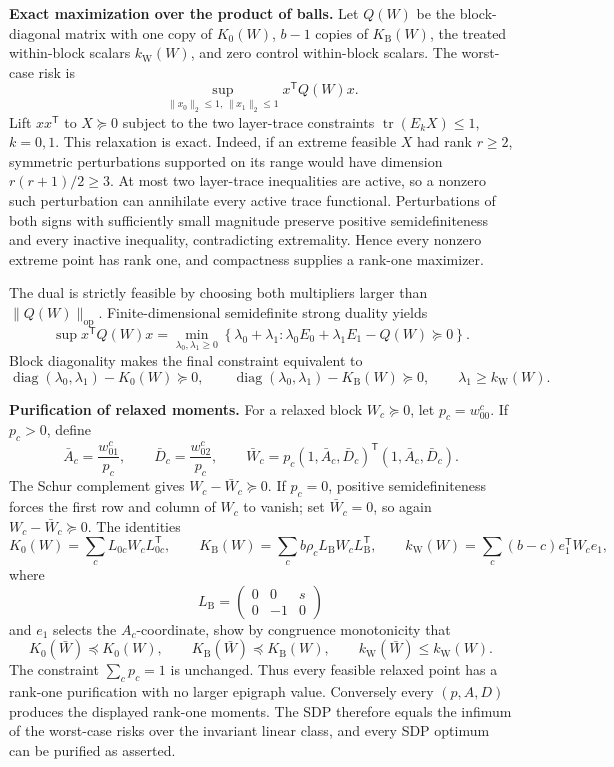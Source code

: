\textbf{Exact maximization over the product of balls.} Let \(Q(W)\) be the block-diagonal matrix with one copy of \(K_0(W)\), \(b-1\) copies of \(K_{\mathrm B}(W)\), the treated within-block scalars \(k_{\mathrm W}(W)\), and zero control within-block scalars. The worst-case risk is
\[
\sup_{\|x_0\|_2\le1,\,\|x_1\|_2\le1}x^{\mathsf T}Q(W)x.
\]
Lift \(xx^{\mathsf T}\) to \(X\succeq0\) subject to the two layer-trace constraints \(\operatorname{tr}(E_kX)\le1\), \(k=0,1\). This relaxation is exact. Indeed, if an extreme feasible \(X\) had rank \(r\ge2\), symmetric perturbations supported on its range would have dimension \(r(r+1)/2\ge3\). At most two layer-trace inequalities are active, so a nonzero such perturbation can annihilate every active trace functional. Perturbations of both signs with sufficiently small magnitude preserve positive semidefiniteness and every inactive inequality, contradicting extremality. Hence every nonzero extreme point has rank one, and compactness supplies a rank-one maximizer.

The dual is strictly feasible by choosing both multipliers larger than \(\|Q(W)\|_{\mathrm{op}}\). Finite-dimensional semidefinite strong duality yields
\[
\sup x^{\mathsf T}Q(W)x
=\min_{\lambda_0,\lambda_1\ge0}
\left\{\lambda_0+\lambda_1:
\lambda_0E_0+\lambda_1E_1-Q(W)\succeq0\right\}.
\]
Block diagonality makes the final constraint equivalent to
\[
\operatorname{diag}(\lambda_0,\lambda_1)-K_0(W)\succeq0,
\qquad
\operatorname{diag}(\lambda_0,\lambda_1)-K_{\mathrm B}(W)\succeq0,
\qquad
\lambda_1\ge k_{\mathrm W}(W).
\]

\textbf{Purification of relaxed moments.} For a relaxed block \(W_c\succeq0\), let \(p_c=w^c_{00}\). If \(p_c>0\), define
\[
\bar A_c=\frac{w^c_{01}}{p_c},
\qquad
\bar D_c=\frac{w^c_{02}}{p_c},
\qquad
\bar W_c=p_c(1,\bar A_c,\bar D_c)^{\mathsf T}(1,\bar A_c,\bar D_c).
\]
The Schur complement gives \(W_c-\bar W_c\succeq0\). If \(p_c=0\), positive semidefiniteness forces the first row and column of \(W_c\) to vanish; set \(\bar W_c=0\), so again \(W_c-\bar W_c\succeq0\). The identities
\[
K_0(W)=\sum_cL_{0c}W_cL_{0c}^{\mathsf T},
\qquad
K_{\mathrm B}(W)=\sum_cb\rho_cL_{\mathrm B}W_cL_{\mathrm B}^{\mathsf T},
\qquad
k_{\mathrm W}(W)=\sum_c(b-c)e_1^{\mathsf T}W_ce_1,
\]
where
\[
L_{\mathrm B}=\begin{pmatrix}0&0&s\\0&-1&0\end{pmatrix}
\]
and \(e_1\) selects the \(A_c\)-coordinate, show by congruence monotonicity that
\[
K_0(\bar W)\preceq K_0(W),
\qquad
K_{\mathrm B}(\bar W)\preceq K_{\mathrm B}(W),
\qquad
k_{\mathrm W}(\bar W)\le k_{\mathrm W}(W).
\]
The constraint \(\sum_cp_c=1\) is unchanged. Thus every feasible relaxed point has a rank-one purification with no larger epigraph value. Conversely every \((p,A,D)\) produces the displayed rank-one moments. The SDP therefore equals the infimum of the worst-case risks over the invariant linear class, and every SDP optimum can be purified as asserted.